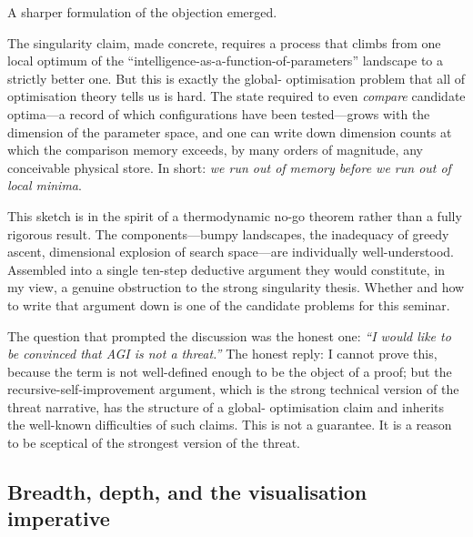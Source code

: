 A sharper formulation of the objection emerged.

\begin{keyresult}\label{kr:singularity}
  The singularity claim, made concrete, requires a process
  that climbs from one local optimum of the
  ``intelligence-as-a-function-of-parameters'' landscape to
  a strictly better one.  But this is exactly the global-
  optimisation problem that all of optimisation theory tells
  us is hard.  The state required to even \emph{compare}
  candidate optima---a record of which configurations have
  been tested---grows with the dimension of the parameter
  space, and one can write down dimension counts at which
  the comparison memory exceeds, by many orders of magnitude,
  any conceivable physical store.  In short: \emph{we run
  out of memory before we run out of local minima}.
\end{keyresult}

\begin{remark}
  This sketch is in the spirit of a thermodynamic
  no-go theorem rather than a fully rigorous result.  The
  components---bumpy landscapes, the inadequacy of greedy
  ascent, dimensional explosion of search space---are
  individually well-understood.  Assembled into a single
  ten-step deductive argument they would constitute, in my
  view, a genuine obstruction to the strong singularity
  thesis.  Whether and how to write that argument down is
  one of the candidate problems for this seminar.
\end{remark}

\begin{audience}
  The question that prompted the discussion was the
  honest one: \emph{``I would like to be convinced that AGI
  is not a threat.''}  The honest reply: I cannot prove
  this, because the term is not well-defined enough to be
  the object of a proof; but the recursive-self-improvement
  argument, which is the strong technical version of the
  threat narrative, has the structure of a global-
  optimisation claim and inherits the well-known
  difficulties of such claims.  This is not a guarantee.
  It is a reason to be sceptical of the strongest version
  of the threat.
\end{audience}

\subsection{Breadth, depth, and the visualisation imperative}\label{sec:breadth-visualisation}

